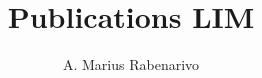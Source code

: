 \documentclass[11pt]{article}
\begin{document}
\title{Publications LIM}
\author{A. Marius Rabenarivo}
\maketitle

\nocite{*}
{}

\end{document}
